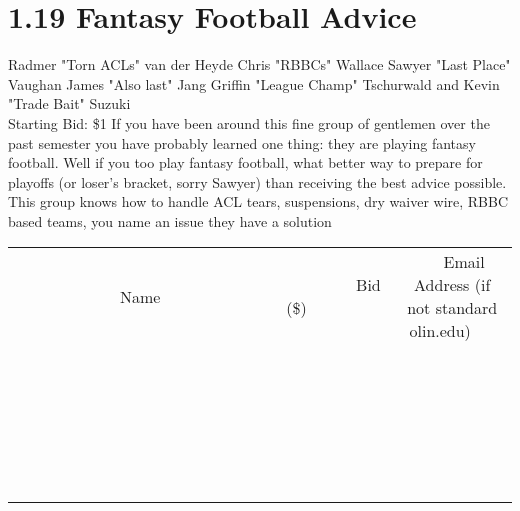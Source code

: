 \documentclass[11pt]{article}
\begin{document}
\section*{1.19 Fantasy Football Advice}
Radmer "Torn ACLs" van der Heyde Chris "RBBCs" Wallace Sawyer "Last Place" Vaughan James "Also last" Jang Griffin "League Champ" Tschurwald and Kevin "Trade Bait" Suzuki
\\
Starting Bid: \$1
\newline
If you have been around this fine group of gentlemen over the past semester you have probably learned one thing: they are playing fantasy football. Well if you too play fantasy football, what better way to prepare for playoffs (or loser's bracket, sorry Sawyer) than receiving the best advice possible. This group knows how to handle ACL tears, suspensions, dry waiver wire, RBBC based teams, you name an issue they have a solution
\\[6ex]
\begin{tabular}{c c c}
~~~~~~~~~~~~~Name~~~~~~~~~~~~~ & ~~~~~~~~~Bid (\$)~~~~~~~~~  & ~~~Email Address (if not standard olin.edu)~~~\\
 & & \\
\hline
 & & \\
\hline
 & & \\
\hline
 & & \\
\hline
 & & \\
\hline
 & & \\
\hline
 & & \\
\hline
 & & \\
\hline
 & & \\
\hline
 & & \\
\hline
 & & \\
\hline
 & & \\
\hline
 & & \\
\hline
 & & \\
\hline
 & & \\
\hline
 & & \\
\hline
 & & \\
\hline
 & & \\
\hline
 & & \\
\hline
 & & \\
\hline
 & & \\
\hline
 & & \\
\hline
 & & \\
\hline
 & & \\
\hline
 & & \\
\hline
 & & \\
\hline
\end{tabular}
\newpage
\end{document}
